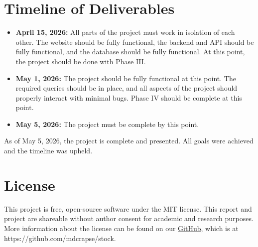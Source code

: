 \documentclass[11pt]{article}
\begin{document}
\section{Timeline of Deliverables}
    \begin{itemize}
        \item \textbf{April 15, 2026:} All parts of the project must work in isolation of each other. The website
        should be fully functional, the backend and API should be fully functional, and the database should be
        fully functional. At this point, the project should be done with Phase III.
        \item \textbf{May 1, 2026:} The project should be fully functional at this point. The required queries
        should be in place, and all aspects of the project should properly interact with minimal bugs. Phase IV
        should be complete at this point.
        \item \textbf{May 5, 2026:} The project must be complete by this point.
    \end{itemize}

    As of May 5, 2026, the project is complete and presented. All goals were achieved and the timeline was upheld.
    
\section{License}
    This project is free, open-source software under the MIT license. This report and project are shareable without author consent for academic and research purposes. More information about the license can be found
    on our \href{https://github.com/mdcrapse/stock?tab=MIT-1-ov-file}{GitHub}, which is at https://github.com/mdcrapse/stock.
\end{document}
